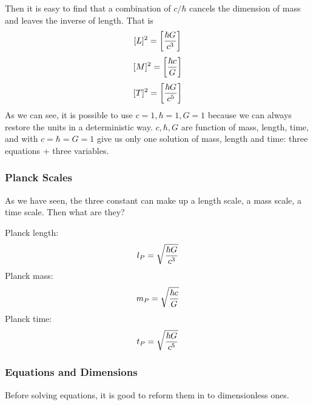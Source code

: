 \documentclass[letterpaper,10pt,english]{sphinxmanual}
\begin{document}
Then it is easy to find that a combination of \(c/\hbar\) cancels the dimension of mass and leaves the inverse of length. That is
\begin{gather}
\begin{split}[ L ]^2 =\left[ \frac{\hbar G}{c^3} \right]\end{split}\notag
\end{gather}\begin{gather}
\begin{split}[ M ]^2 = \left [ \frac{\hbar c}{ G } \right]\end{split}\notag
\end{gather}\begin{gather}
\begin{split}[T]^2 = \left[ \frac{ \hbar G }{ c^5 }  \right]\end{split}\notag
\end{gather}
As we can see, it is possible to use \(c=1, \hbar = 1, G =1\) because we can always restore the units in a deterministic way. \(c, \hbar, G\) are function of mass, length, time, and with \(c = \hbar = G=1\) give us only one solution of mass, length and time: three equations + three variables.


\subsubsection{Planck Scales}
\label{Basic:planck-scales}
As we have seen, the three constant can make up a length scale, a mass scale, a time scale. Then what are they?

Planck length:
\begin{gather}
\begin{split}l_P = \sqrt{ \frac{ \hbar G }{ c^3 } }\end{split}\notag
\end{gather}
Planck mass:
\begin{gather}
\begin{split}m_P = \sqrt{ \frac{ \hbar c }{ G } }\end{split}\notag
\end{gather}
Planck time:
\begin{gather}
\begin{split}t_P = \sqrt{ \frac{\hbar G}{ c^5 } }\end{split}\notag
\end{gather}

\subsubsection{Equations and Dimensions}
\label{Basic:equations-and-dimensions}
Before solving equations, it is good to reform them in to dimensionless ones.
\end{document}
